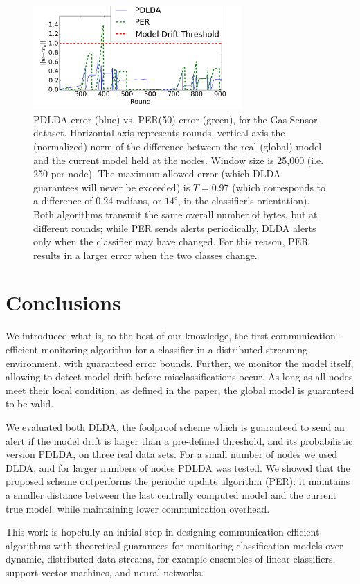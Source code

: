 \begin{figure}
  \includegraphics[width=80mm,height=40mm]{graphics/PDLADvsPERGas.png}%
 \caption{PDLDA error (blue) vs. PER(50) error (green), for the Gas Sensor dataset. Horizontal axis represents rounds, vertical
	axis  the (normalized) norm of the difference between the real (global) model and the current model held at the nodes. Window size is 25,000 (i.e. 250 per node).
	The maximum allowed error (which DLDA guarantees will never be
	exceeded) is $T = 0.97$ (which corresponds to a difference of
	0.24 radians, or $14^{\circ}$, in the classifier's orientation). Both
	algorithms transmit the same overall number of bytes, but at different
	rounds; while PER sends alerts periodically, DLDA alerts only when the 
	classifier may have changed. For this reason, PER results in a larger
	error when the two classes change. }
\label{PDLADvsPERGas}%
\end{figure}





\section*{Conclusions}
We introduced what is, to the best of our knowledge, the first communication-efficient monitoring algorithm for a classifier in a distributed streaming environment, with guaranteed
error bounds.
Further, we monitor the
model itself, allowing to detect model drift before misclassifications occur.
As long as all nodes meet their local condition, as defined in
the paper, the
global model is guaranteed to be valid. 

%
We evaluated both DLDA, the foolproof scheme which is guaranteed to send an
alert if the model drift is larger than a pre-defined threshold, and its probabilistic 
version PDLDA, on three real data sets.
For a small number of nodes we used DLDA, and for larger numbers of nodes 
PDLDA was tested. We showed that the proposed scheme outperforms the periodic update algorithm (PER): it maintains a smaller distance between
the last centrally computed model and the current true model, while maintaining 
lower communication overhead.

This work is hopefully an initial step in designing communication-efficient algorithms
with theoretical guarantees for monitoring classification models over dynamic, distributed data streams, for example
ensembles of linear classifiers, support vector machines, and neural networks.




